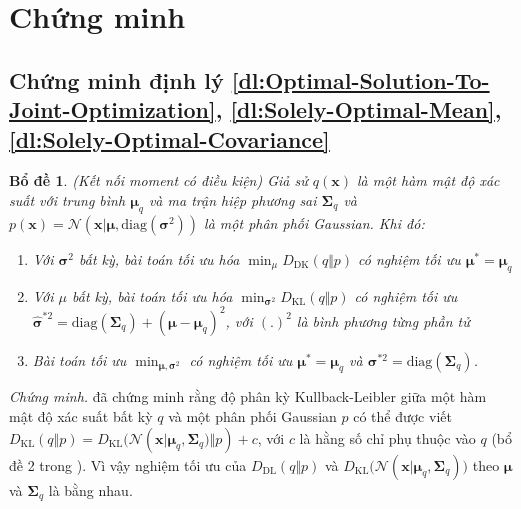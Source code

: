 \documentclass[14pt, a4paper]{article}
\numberwithin{equation}{section}
\numberwithin{figure}{section}
\newtheorem{bd}{Bổ đề}
\numberwithin{dl}{section}
\numberwithin{md}{section}
\numberwithin{bd}{section}
\numberwithin{dn}{section}
\numberwithin{hq}{section}
\begin{document}
    \newpage
    \printbibliography[title={TÀI LIỆU THAM KHẢO}]

    \newpage

    \appendix

    \section{Chứng minh}

    \subsection{Chứng minh định lý \ref{dl:Optimal-Solution-To-Joint-Optimization}, \ref{dl:Solely-Optimal-Mean}, \ref{dl:Solely-Optimal-Covariance}}

    \begin{bd} \label{bd:Conditioned-Moment-Matching} (Kết nối moment có điều kiện) Giả sử $q(\boldsymbol{x})$ là một hàm mật độ xác suất với trung bình $\boldsymbol{\mu}_q$ và ma trận hiệp phương sai $\boldsymbol{\Sigma}_q$ và $p(\boldsymbol{x})=\mathcal{N}(\boldsymbol{x} \vert \boldsymbol{\mu}, \mathrm{diag}(\boldsymbol{\sigma}^2))$ là một phân phối Gaussian. Khi đó:

    \begin{enumerate}
        \item Với $\boldsymbol{\sigma}^2$ bất kỳ, bài toán tối ưu hóa $\displaystyle\min_{\mu} D_{\mathrm{DK}} (q \Vert p)$ có nghiệm tối ưu $\boldsymbol{\mu}^{\ast}=\boldsymbol{\mu}_q$
        \item Với $\mu$ bất kỳ, bài toán tối ưu hóa $\displaystyle\min_{\boldsymbol{\sigma}^2} D_{\mathrm{KL}}(q \Vert p)$ có nghiệm tối ưu $\hat{\boldsymbol{\sigma}}^{\ast 2}=\mathrm{diag}(\boldsymbol{\Sigma}_q) + (\boldsymbol{\mu} - \boldsymbol{\mu}_q)^2$, với $(.)^2$ là bình phương từng phần tử
        \item Bài toán tối ưu $\displaystyle\min_{\boldsymbol{\mu}, \boldsymbol{\sigma}^2}$ có nghiệm tối ưu $\boldsymbol{\mu}^{\ast}=\boldsymbol{\mu}_q$ và $\boldsymbol{\sigma}^{\ast 2} = \mathrm{diag} (\boldsymbol{\Sigma}_q)$.
    \end{enumerate}

    \end{bd}

    \textit{Chứng minh.} \cite{bao2021analytic} đã chứng minh rằng độ phân kỳ Kullback-Leibler giữa một hàm mật độ xác suất bất kỳ $q$ và một phân phối Gaussian $p$ có thể được viết $D_{\mathrm{KL}}(q \Vert p)=D_{\mathrm{KL}}\big(\mathcal{N}(\boldsymbol{x} \vert \boldsymbol{\mu}_q, \boldsymbol{\Sigma}_q \big) \Vert p) + c$, với $c$ là hằng số chỉ phụ thuộc vào $q$ (bổ đề 2 trong \cite{bao2021analytic}).
    Vì vậy nghiệm tối ưu của $D_{\mathrm{DL}} (q \Vert p)$ và $D_{\mathrm{KL}} \big( \mathcal{N} (\boldsymbol{x} \vert \boldsymbol{\mu}_q, \boldsymbol{\Sigma}_q) \big)$ theo $\boldsymbol{\mu}$ và $\boldsymbol{\Sigma}_q$ là bằng nhau.
\end{document}
